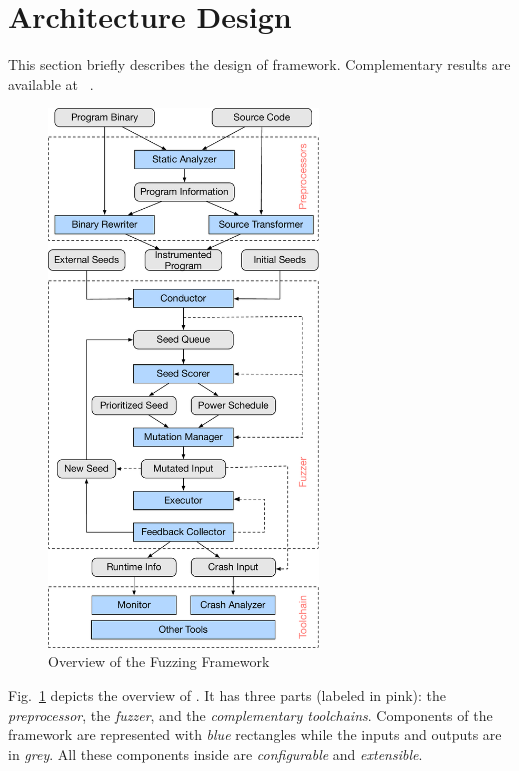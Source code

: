 \section{Architecture Design}\label{sec:details}

This section briefly describes the design of {\FOT} framework. Complementary results {\FOT} are available at ~\cite{fot-webpage}.


\begin{figure}[t]
	\centering
	\includegraphics[width=0.64\textwidth]{res/fot/FOT_overview}
	\caption{Overview of the {\FOT} Fuzzing Framework}
	\label{fig:fot_workflow}
\end{figure}

Fig.~\ref{fig:fot_workflow} depicts the overview of {\FOT}.
It has three parts (labeled in pink): the \emph{preprocessor}, the \emph{fuzzer}, and the \emph{complementary toolchains}.
Components of the framework are represented with \emph{blue} rectangles while the inputs and outputs are in \emph{grey}. All these components inside \FOT are \textit{configurable} and \textit{extensible}.



